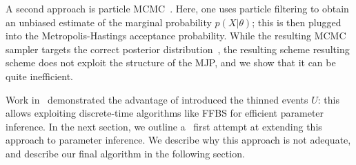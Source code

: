 A second approach is particle MCMC~\cite{Andrieu10}. Here, one uses 
particle filtering to obtain an unbiased estimate of the marginal 
probability $p(X|\theta)$; this is then plugged into the 
Metropolis-Hastings acceptance probability. While the resulting MCMC 
sampler targets the correct posterior distribution~\cite{Andrieu09}, 
the resulting scheme resulting scheme does not exploit the structure 
of the MJP, and we show that it can be quite inefficient.

Work in~\cite{RaoTeh13, RaoTeh12} demonstrated the advantage of
introduced the thinned events $U$: this allows exploiting discrete-time 
algorithms like FFBS for efficient parameter inference.
In the next section, we outline a \naive\  first attempt at extending this 
approach to parameter inference.
We describe why this approach is not adequate, and describe our
final algorithm in the following section. 

